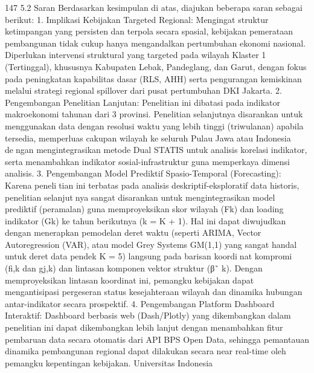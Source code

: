 147
5.2 Saran
Berdasarkan kesimpulan di atas, diajukan beberapa saran sebagai berikut:
1. Implikasi Kebijakan Targeted Regional: Mengingat struktur ketimpangan yang
persisten dan terpola secara spasial, kebijakan pemerataan pembangunan tidak
cukup hanya mengandalkan pertumbuhan ekonomi nasional. Diperlukan intervensi
struktural yang targeted pada wilayah Klaster 1 (Tertinggal), khususnya Kabupaten
Lebak, Pandeglang, dan Garut, dengan fokus pada peningkatan kapabilitas dasar
(RLS, AHH) serta pengurangan kemiskinan melalui strategi regional spillover dari
pusat pertumbuhan DKI Jakarta.
2. Pengembangan Penelitian Lanjutan: Penelitian ini dibatasi pada indikator
makroekonomi tahunan dari 3 provinsi. Penelitian selanjutnya disarankan untuk
menggunakan data dengan resolusi waktu yang lebih tinggi (triwulanan) apabila
tersedia, memperluas cakupan wilayah ke seluruh Pulau Jawa atau Indonesia dengan mengintegrasikan metode Dual STATIS untuk analisis korelasi indikator, serta
menambahkan indikator sosial-infrastruktur guna memperkaya dimensi analisis.
3. Pengembangan Model Prediktif Spasio-Temporal (Forecasting): Karena penelitian ini terbatas pada analisis deskriptif-eksploratif data historis, penelitian selanjutnya sangat disarankan untuk mengintegrasikan model prediktif (peramalan) guna
memproyeksikan skor wilayah (Fk) dan loading indikator (Gk) ke tahun berikutnya
(k = K + 1). Hal ini dapat diwujudkan dengan menerapkan pemodelan deret waktu
(seperti ARIMA, Vector Autoregression (VAR), atau model Grey Systems GM(1,1)
yang sangat handal untuk deret data pendek K = 5) langsung pada barisan koordinat kompromi (fi,k dan gj,k) dan lintasan komponen vektor struktur (β˜
k). Dengan
memproyeksikan lintasan koordinat ini, pemangku kebijakan dapat mengantisipasi
pergeseran status kesejahteraan wilayah dan dinamika hubungan antar-indikator
secara prospektif.
4. Pengembangan Platform Dashboard Interaktif: Dashboard berbasis web
(Dash/Plotly) yang dikembangkan dalam penelitian ini dapat dikembangkan lebih
lanjut dengan menambahkan fitur pembaruan data secara otomatis dari API BPS
Open Data, sehingga pemantauan dinamika pembangunan regional dapat dilakukan
secara near real-time oleh pemangku kepentingan kebijakan.
Universitas Indonesia

